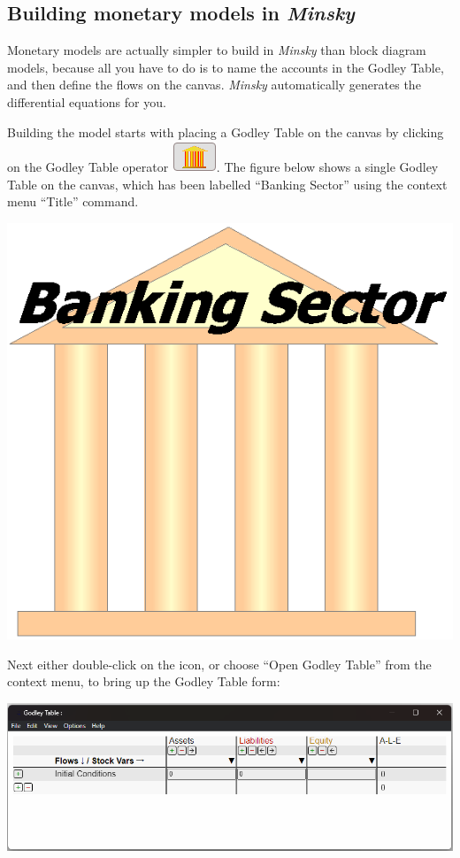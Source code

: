 \subsection{Building monetary models in \emph{Minsky}}

Monetary models are actually simpler to build in \emph{Minsky} than
block diagram models, because all you have to do is to name the accounts
in the Godley Table, and then define the flows on the canvas. \emph{Minsky}
automatically generates the differential equations for you.

Building the model starts with placing a Godley Table on the canvas
by clicking on the Godley Table operator \includegraphics{images/GodleyIcon}.
The figure below shows a single Godley Table on the canvas, which
has been labelled ``Banking Sector'' using the context menu ``Title''
command.

\includegraphics{images/MonetaryModel01GodleyTable01}

Next either double-click on the icon, or choose ``Open Godley Table''
from the context menu, to bring up the Godley Table form:

\includegraphics{images/GodleyTableEditWindow}

